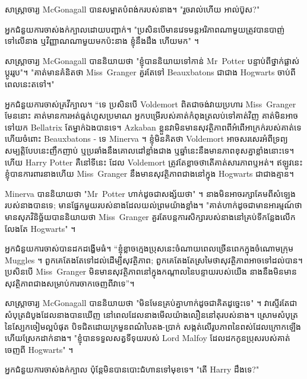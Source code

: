 សាស្រ្តាចារ្យ McGonagall បានសម្អាតបំពង់ករបស់នាង។ "រួចរាល់ហើយ អាល់ប៊ូស?"

អ្នកជំនួយការចាស់ងក់ក្បាលដោយបញ្ជាក់។ "ប្រសិនបើមានវេទមន្តអរិភាពណាមួយត្រូវបានបាញ់ទៅលើនាង ឬវិញ្ញាណណាមួយមកប៉ះនាង ខ្ញុំនឹងដឹង ហើយមក" ។

សាស្រ្តាចារ្យ McGonagall បាននិយាយថា "ខ្ញុំបាននិយាយទៅកាន់ Mr~Potter បន្ទាប់ពីថ្នាក់ផ្លាស់ប្តូររូប"។ "គាត់មានគំនិតថា Miss~Granger គួរតែទៅ Beauxbatons ជាជាង Hogwarts ចាប់ពីពេលនេះតទៅ។"

អ្នកជំនួយការចាស់គ្រវីក្បាល។ “ទេ ប្រសិនបើ Voldemort ពិតជាចង់វាយប្រហារ Miss~Granger មែននោះ គាត់មានការអត់ធ្មត់ហួសប្រមាណ អ្នកបម្រើរបស់គាត់កំពុងត្រលប់ទៅគាត់វិញ គាត់មិនអាចទៅយក Bellatrix តែម្នាក់ឯងបានទេ។ Azkaban ខ្លួនវាមិនមានសុវត្ថិភាពពីអំពើអាក្រក់របស់គាត់ទេ ហើយចំពោះ Beauxbatons - ទេ Minerva ។ ខ្ញុំមិនគិតថា Voldemort អាចសរសេរអំពីទ្រព្យសម្បត្តិបែបនេះញឹកញាប់ ឬប្រឆាំងនឹងគោលដៅខ្លាំងជាង ឬឆ្នាំនេះនឹងមានភាពខុសគ្នាខ្លាំងនោះទេ។ ហើយ Harry Potter គឺនៅទីនេះ ដែល Voldemort ត្រូវតែខ្លាចថាតើគាត់សារភាពឬអត់។ ឥឡូវនេះខ្ញុំបានការពារនាងហើយ Miss~Granger នឹងមានសុវត្ថិភាពជាងនៅក្នុង Hogwarts ជាជាងគ្មាន។

Minerva បាននិយាយថា "Mr~Potter ហាក់ដូចជាសង្ស័យថា" ។ នាង​មិន​អាច​រក្សា​គែម​ពី​សំឡេង​របស់​នាង​បាន​ទេ; មានផ្នែកមួយរបស់នាងដែលយល់ព្រមយ៉ាងខ្លាំង។ "គាត់ហាក់ដូចជាមានអារម្មណ៍ថាមានសុភវិនិច្ឆ័យបាននិយាយថា Miss~Granger គួរតែបន្តការសិក្សារបស់នាងនៅគ្រប់ទីកន្លែងលើកលែងតែ Hogwarts" ។

អ្នកជំនួយការចាស់បានដកដង្ហើមធំ។ “ខ្ញុំខ្លាចក្មេងប្រុសនេះចំណាយពេលច្រើនពេកក្នុងចំណោមក្រុម Muggles ។ ពួកគេតែងតែទៅដល់ដើម្បីសុវត្ថិភាព; ពួកគេតែងតែស្រមៃថាសុវត្ថិភាពអាចទៅដល់បាន។ ប្រសិនបើ Miss~Granger មិនមានសុវត្ថិភាពនៅក្នុងកណ្តាលនៃបន្ទាយរបស់យើង នាងនឹងមិនមានសុវត្ថិភាពជាងសម្រាប់ការចាកចេញពីវាទេ”។

សាស្រ្តាចារ្យ McGonagall បាននិយាយថា "មិនមែនគ្រប់គ្នាហាក់ដូចជាគិតដូច្នេះទេ" ។ វាស្ទើរតែជាសំបុត្រដំបូងដែលនាងបានឃើញ នៅពេលដែលនាងមើលយ៉ាងលឿននៅតុរបស់នាង។ ស្រោមសំបុត្រនៃស្បែកចៀមល្អបំផុត បិទជិតដោយក្រមួនពណ៌បៃតង-ប្រាក់ សង្កត់លើរូបភាពនៃពស់ដែលក្រោកឡើង ហើយស្រែកដាក់នាង។ "ខ្ញុំបានទទួលសត្វទីទុយរបស់ Lord Malfoy ដែលដកកូនប្រុសរបស់គាត់ចេញពី Hogwarts" ។

អ្នក​ជំនួយការ​ចាស់​ងក់​ក្បាល ប៉ុន្តែ​មិន​បាន​បោះជំហាន​ទៅមុខ​ទេ។ "តើ Harry ដឹងទេ?"

